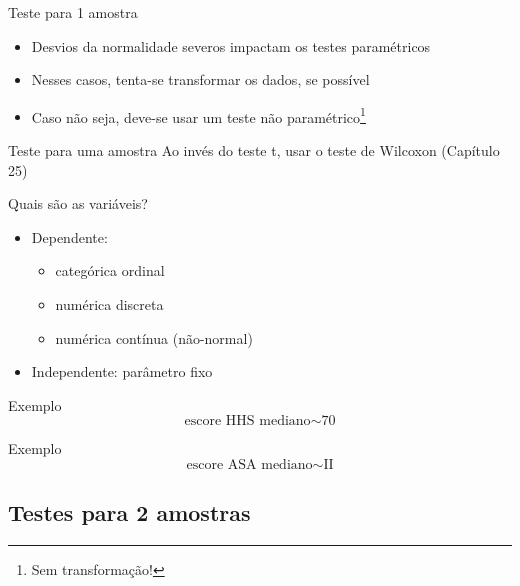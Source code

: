 \documentclass{beamer}
\begin{document}
\begin{frame}{Teste para 1 amostra}
  \begin{itemize}
    \small
  \item Desvios da normalidade severos impactam os testes paramétricos
    \bigskip
  \item Nesses casos, tenta-se transformar os dados, se possível
  \item Caso não seja, deve-se usar um teste não paramétrico\footnote{Sem transformação!}
  \end{itemize}
  \bigskip
  \begin{block}{Teste para uma amostra}
    Ao invés do teste t, usar o teste de Wilcoxon {\footnotesize (Capítulo 25)}
  \end{block}
\end{frame}

\begin{frame}{Quais são as variáveis?}
  \begin{itemize}
    \small
  \item Dependente:
    \begin{itemize}
      \footnotesize
    \item categórica ordinal
    \item numérica discreta
    \item numérica contínua (não-normal)
    \end{itemize}
  \item Independente: parâmetro fixo
  \end{itemize}
  \vfill
  \begin{exampleblock}{Exemplo}
    \begin{displaymath}
      \text{escore HHS mediano} \sim \text{70}
    \end{displaymath}
  \end{exampleblock}
  \begin{exampleblock}{Exemplo}
    \begin{displaymath}
      \text{escore ASA mediano} \sim \text{II}
  \end{displaymath}

  \end{exampleblock}
\end{frame}

\subsection[2 médias]{Testes para 2 amostras}
\end{document}
